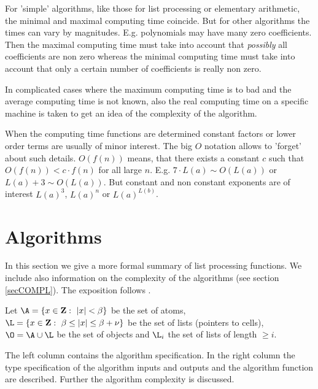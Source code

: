 For 'simple' algorithms, like those for list processing or
elementary arithmetic,
the minimal and maximal computing time coincide. 
But for other algorithms the times can 
vary by magnitudes.
E.g. polynomials may have many zero coefficients.  
Then the maximal computing time must take into account that 
{\em possibly} all coefficients are non zero 
whereas the minimal computing time must take into account 
that only a certain number of coefficients    
is really non zero.

In complicated cases where the maximum 
computing time is to bad and the average computing time
is not known, also the real computing time on a specific 
machine is taken to get an idea of the 
complexity of the algorithm.

When the computing time functions are determined
constant factors or lower order terms are usually
of minor interest. The big $O$ notation
allows to 'forget' about such details.
$O( f(n) )$ means, that there exists a constant $c$ such that
$O( f(n) ) < c \cdot f(n)$ for all large $n$.
E.g. 
$ 7 \cdot L(a) \sim O(L(a)) $ or
$ L(a) + 3 \sim O(L(a)) $.
But constant and non constant exponents are of interest 
$L(a)^3$, $L(a)^n$ or $L(a)^{L(b)}$.



\section{Algorithms}

In this section we give a more formal summary of
list processing functions. 
We include also information on the complexity of the 
algorithms (see section \ref{secCOMPL}).
The exposition follows \cite{Loos 76}.

Let $ \A = \{ x \in {\rm \bf Z} : \ 
              \vert x \vert < \beta \} $ 
be the set of atoms, \\
$ \L = \{ x \in {\rm \bf Z} : \ 
              \beta \leq \vert x \vert \leq \beta+\nu \} $ 
be the set of lists (pointers to cells), \\
$ \O = \A \cup \L $ be the set of objects 
and $ \L_i $ the set of lists of length $ \geq i$.

The left column contains the algorithm specification.
In the right column the type specification of the algorithm 
inputs and outputs and the algorithm function are described. 
Further the algorithm complexity is discussed. 

